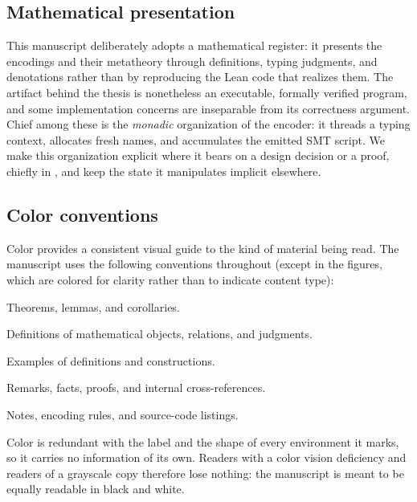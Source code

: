 \subsection{Mathematical presentation}
This manuscript deliberately adopts a mathematical register: it presents the
encodings and their metatheory through definitions, typing judgments, and
denotations rather than by reproducing the Lean code that realizes them. The
artifact behind the thesis is nonetheless an executable, formally verified
program, and some implementation concerns are inseparable from its correctness
argument. Chief among these is the \emph{monadic} organization of the encoder:
it threads a typing context, allocates fresh names, and accumulates the emitted
SMT script. We make this organization explicit where it bears on a design
decision or a proof, chiefly in
, and keep
the state it manipulates implicit elsewhere.

\subsection{Color conventions}
Color provides a consistent visual guide to the kind of material being read.
The manuscript uses the following conventions throughout (except in the figures, which are colored for clarity rather than to indicate content type):

\smallskip
\begin{description}[
    style=multiline,
    nosep,
    leftmargin=30mm,
    labelwidth=18mm,
    labelsep=5mm,
    align=left
  ]
  \item[\overviewcolorbox{pink}{white}{Pink}]
    Theorems, lemmas, and corollaries.
  \item[\overviewcolorbox{orange}{white}{Orange}]
    Definitions of mathematical objects, relations, and judgments.
  \item[\overviewcolorbox{green}{white}{Green}]
    Examples of definitions and constructions.
  \item[\overviewcolorbox{blue}{dark-blue}{Blue}]
    Remarks, facts, proofs, and internal cross-references.
  \item[\overviewcolorbox{beige}{cover-cream}{Beige}]
    Notes, encoding rules, and source-code listings.
\end{description}
\medskip

Color is redundant with the label and the shape of every environment it marks,
so it carries no information of its own. Readers with a color vision deficiency
and readers of a grayscale copy therefore lose nothing: the manuscript is meant
to be equally readable in black and white.


